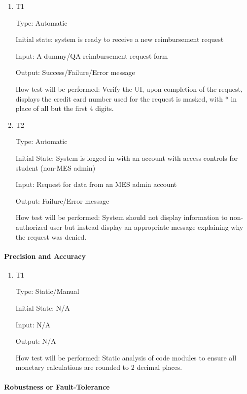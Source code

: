 \documentclass[12pt, titlepage]{article}
\begin{document}
\begin{enumerate}

\item{T1\\}

Type: Automatic

Initial state: system is ready to receive a new reimbursement request

Input: A dummy/QA reimbursement request form

Output: Success/Failure/Error message

How test will be performed: Verify the UI, upon completion of the request, displays the credit card number used for the request is masked, with * in place of all but the first 4 digits.

\item{T2\\}

Type: Automatic 

Initial State: System is logged in with an account with access controls for student (non-MES admin)

Input: Request for data from an MES admin account

Output: Failure/Error message

How test will be performed: System should not display information to non-authorized user but instead display an appropriate message explaining why the request was denied.
\end{enumerate}

\paragraph{Precision and Accuracy}

\begin{enumerate}
\item{T1\\}

Type: Static/Manual 

Initial State: N/A

Input: N/A

Output: N/A

How test will be performed: Static analysis of code modules to ensure all monetary calculations are rounded to 2 decimal places.
\end{enumerate}

\paragraph{Robustness or Fault-Tolerance}
\end{document}
